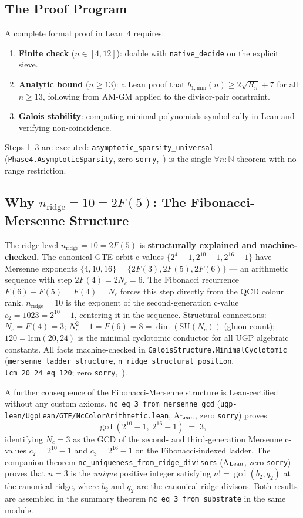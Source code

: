 \documentclass[11pt]{article}
\theoremstyle{remark}
\newcommand{\Nc}{N_c}
\newcommand{\bonemin}{b_{1,\mathrm{min}}}
\begin{document}
\subsection{The Proof Program}

A complete formal proof in Lean~4 requires:
\begin{enumerate}[leftmargin=2em]
  \item \textbf{Finite check} ($n \in [4,12]$): doable with \texttt{native\_decide}
    on the explicit sieve.
  \item \textbf{Analytic bound} ($n \geq 13$): a Lean proof that
    $\bonemin(n) \geq 2\sqrt{R_n} + 7$ for all $n \geq 13$, following from
    AM-GM applied to the divisor-pair constraint.
  \item \textbf{Galois stability}: computing minimal polynomials symbolically in
    Lean and verifying non-coincidence.
\end{enumerate}
Steps 1--3 are executed:
\texttt{asymptotic\_sparsity\_universal}
(\texttt{Phase4.AsymptoticSparsity}, zero \texttt{sorry},~\cite{ugp-lean}) is the
single $\forall n : \mathbb{N}$ theorem with no range restriction.

\subsection{Why $n_{\mathrm{ridge}} = 10 = 2F(5)$: The Fibonacci-Mersenne Structure}
\label{subsec:fibonacci_ridge}

The ridge level $n_{\mathrm{ridge}} = 10 = 2F(5)$ is \textbf{structurally explained
and machine-checked.}
The canonical GTE orbit c-values $\{2^4-1, 2^{10}-1, 2^{16}-1\}$ have Mersenne
exponents $\{4, 10, 16\} = \{2F(3), 2F(5), 2F(6)\}$ --- an arithmetic sequence
with step $2F(4) = 2\Nc = 6$.
The Fibonacci recurrence $F(6) - F(5) = F(4) = \Nc$ forces this step directly from
the QCD colour rank.
$n_{\mathrm{ridge}} = 10$ is the exponent of the second-generation c-value
$c_2 = 1023 = 2^{10}-1$, centering it in the sequence.
Structural connections: $\Nc = F(4) = 3$; $\Nc^2-1 = F(6) = 8 = \dim(\mathrm{SU}(\Nc))$
(gluon count); $120 = \mathrm{lcm}(20,24)$ is the minimal cyclotomic conductor
for all UGP algebraic constants.
All facts machine-checked in \texttt{GaloisStructure.MinimalCyclotomic}
(\texttt{mersenne\_ladder\_structure}, \texttt{n\_ridge\_structural\_position},
\texttt{lcm\_20\_24\_eq\_120}; zero \texttt{sorry},~\cite{ugp-lean}).

A further consequence of the Fibonacci-Mersenne structure is Lean-certified
without any custom axioms.
\texttt{nc\_eq\_3\_from\_mersenne\_gcd}
(\texttt{ugp-lean/UgpLean/GTE/NcColorArithmetic.lean}, A$_{\rm Lean}$, zero \texttt{sorry})
proves
\[
  \gcd(2^{10}-1,\;2^{16}-1) \;=\; 3,
\]
identifying $\Nc = 3$ as the GCD of the second- and third-generation Mersenne
c-values $c_2 = 2^{10}-1$ and $c_3 = 2^{16}-1$ on the Fibonacci-indexed ladder.
The companion theorem \texttt{nc\_uniqueness\_from\_ridge\_divisors}
(A$_{\rm Lean}$, zero \texttt{sorry}) proves that $n = 3$ is the \emph{unique} positive
integer satisfying $n! = \gcd(b_2, q_2)$ at the canonical ridge, where $b_2$ and
$q_2$ are the canonical ridge divisors.
Both results are assembled in the summary theorem
\texttt{nc\_eq\_3\_from\_substrate} in the same module.
\end{document}
